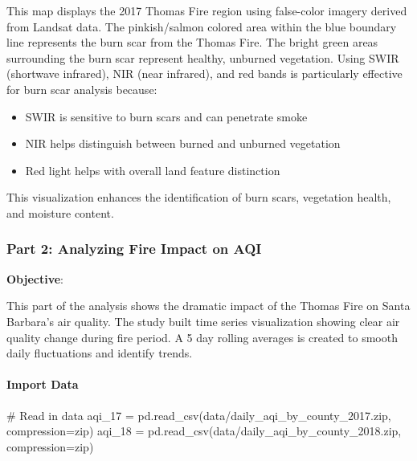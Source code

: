 \documentclass[
  letterpaper,
  DIV=11,
  numbers=noendperiod]{scrartcl}
\let\oldparagraph\paragraph
\renewcommand{\paragraph}[1]{\oldparagraph{#1}\mbox{}}
\newenvironment{Shaded}{\begin{snugshade}}{\end{snugshade}}
\newcommand{\CommentTok}[1]{\textcolor[rgb]{0.37,0.37,0.37}{#1}}
\newcommand{\NormalTok}[1]{\textcolor[rgb]{0.00,0.23,0.31}{#1}}
\newcommand{\OperatorTok}[1]{\textcolor[rgb]{0.37,0.37,0.37}{#1}}
\newcommand{\StringTok}[1]{\textcolor[rgb]{0.13,0.47,0.30}{#1}}
\providecommand{\tightlist}{%
  \setlength{\itemsep}{0pt}\setlength{\parskip}{0pt}}\usepackage{longtable,booktabs,array}
\begin{document}
This map displays the 2017 Thomas Fire region using false-color imagery
derived from Landsat data. The pinkish/salmon colored area within the
blue boundary line represents the burn scar from the Thomas Fire. The
bright green areas surrounding the burn scar represent healthy, unburned
vegetation. Using SWIR (shortwave infrared), NIR (near infrared), and
red bands is particularly effective for burn scar analysis because:

\begin{itemize}
\tightlist
\item
  SWIR is sensitive to burn scars and can penetrate smoke
\item
  NIR helps distinguish between burned and unburned vegetation
\item
  Red light helps with overall land feature distinction
\end{itemize}

This visualization enhances the identification of burn scars, vegetation
health, and moisture content.

\hypertarget{part-2-analyzing-fire-impact-on-aqi}{%
\subsubsection{Part 2: Analyzing Fire Impact on
AQI}\label{part-2-analyzing-fire-impact-on-aqi}}

\textbf{Objective}:

This part of the analysis shows the dramatic impact of the Thomas Fire
on Santa Barbara's air quality. The study built time series
visualization showing clear air quality change during fire period. A 5
day rolling averages is created to smooth daily fluctuations and
identify trends.

\hypertarget{import-data-1}{%
\paragraph{Import Data}\label{import-data-1}}

\begin{Shaded}
\begin{Highlighting}[]
\CommentTok{\# Read in data}
\NormalTok{aqi\_17 }\OperatorTok{=}\NormalTok{ pd.read\_csv(}\StringTok{\textquotesingle{}data/daily\_aqi\_by\_county\_2017.zip\textquotesingle{}}\NormalTok{, compression}\OperatorTok{=}\StringTok{\textquotesingle{}zip\textquotesingle{}}\NormalTok{)}
\NormalTok{aqi\_18 }\OperatorTok{=}\NormalTok{ pd.read\_csv(}\StringTok{\textquotesingle{}data/daily\_aqi\_by\_county\_2018.zip\textquotesingle{}}\NormalTok{, compression}\OperatorTok{=}\StringTok{\textquotesingle{}zip\textquotesingle{}}\NormalTok{)}
\end{Highlighting}
\end{Shaded}
\end{document}
